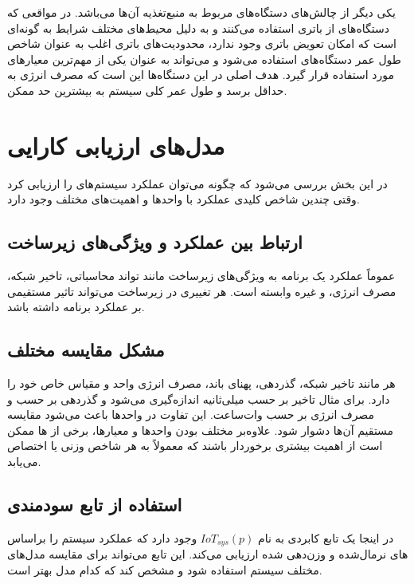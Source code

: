 \documentclass[a4paper]{article}
\begin{document}
یکی دیگر از چالش‌های دستگاه‌های  مربوط به منبع‌تغذیه آن‌ها می‌باشد. در
مواقعی که دستگاه‌های  از باتری استفاده می‌کنند و به دلیل محیط‌های مختلف
شرایط به گونه‌ای است که امکان تعویض باتری وجود ندارد، محدودیت‌های باتری اغلب به
عنوان شاخص طول عمر دستگاه‌های  استفاده می‌شود و می‌تواند به عنوان یکی از
مهم‌ترین معیار‌های  مورد استفاده قرار گیرد. هدف اصلی در این دستگاه‌ها
این است که مصرف انرژی به حداقل برسد و طول عمر کلی سیستم به بیشترین حد ممکن.

\section{مدل‌های ارزیابی کارایی}

در این بخش بررسی می‌شود که چگونه می‌توان عملکرد سیستم‌های  را ارزیابی
کرد وقتی چندین شاخص کلیدی عملکرد  با واحد‌ها و اهمیت‌های مختلف وجود
دارد.

\subsection{ارتباط بین عملکرد و ویژگی‌های زیرساخت }

عموماً عملکرد یک برنامه به ویژگی‌های زیرساخت  مانند تواند محاسباتی،
تاخیر شبکه، مصرف انرژی، و غیره وابسته است. هر تغییری در زیرساخت 
می‌تواند تاثیر مستقیمی بر عملکرد برنامه داشته باشد.

\subsection{مشکل مقایسه  مختلف}

هر  مانند تاخیر شبکه، گذردهی، پهنای باند، مصرف انرژی واحد و مقیاس خاص
خود را دارد. برای مثال تاخیر بر حسب میلی‌ثانیه  اندازه‌گیری می‌شود و
گذردهی بر حسب  و مصرف انرژی بر حسب وات‌ساعت. این تفاوت در واحد‌ها باعث
می‌شود مقایسه مستقیم آن‌ها دشوار شود. علاوه‌بر مختلف بودن واحد‌ها و معیار‌ها،
برخی از ها ممکن است از اهمیت بیشتری برخوردار باشند که معمولاً به هر شاخص
وزنی یا  اختصاص می‌یابد.

\subsection{استفاده از تابع سودمندی }

در اینجا یک تابع کابردی به نام $IoT_{sys}(p)$ وجود دارد که عملکرد سیستم 
را براساس های نرمال‌شده و وزن‌دهی شده ارزیابی می‌کند. این تابع می‌تواند
برای مقایسه مدل‌های مختلف سیستم  استفاده شود و مشخص کند که کدام مدل بهتر
است.
\end{document}
